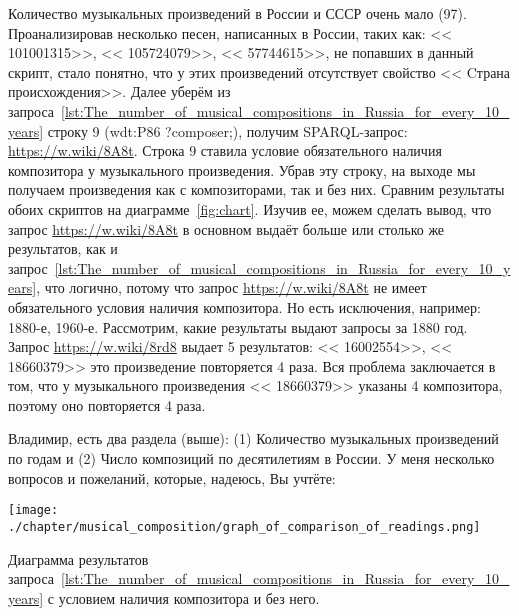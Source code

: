 Количество музыкальных произведений в России и СССР очень мало (97). Проанализировав несколько песен, написанных в России, таких как: << {101001315}>>, << {105724079}>>, << {57744615}>>, не попавших в данный скрипт, стало понятно, что у этих произведений отсутствует свойство << {Cтрана происхождения}>>.
Далее уберём из запроса~\ref{lst:The_number_of_musical_compositions_in_Russia_for_every_10_years} строку 9 (wdt:P86 ?composer;), получим SPARQL-запрос: \href{https://w.wiki/8A8t}{https://w.wiki/8A8t}. Строка 9 ставила условие обязательного наличия композитора у музыкального произведения. Убрав эту строку, на выходе мы получаем произведения как с композиторами, так и без них. Сравним результаты обоих скриптов на диаграмме~\ref{fig:chart}. Изучив ее, можем сделать вывод, что запрос \href{https://w.wiki/8A8t}{https://w.wiki/8A8t} в основном выдаёт больше или столько же результатов, как и запрос~\ref{lst:The_number_of_musical_compositions_in_Russia_for_every_10_years}, что логично, потому что запрос \href{https://w.wiki/8A8t}{https://w.wiki/8A8t} не имеет обязательного условия наличия композитора. Но есть исключения, например: 1880-е, 1960-е. Рассмотрим, какие результаты выдают запросы за 1880 год. Запрос \href{https://w.wiki/8rd8}{https://w.wiki/8rd8} выдает 5 результатов: << {16002554}>>, << {18660379}>> это произведение повторяется 4 раза. Вся проблема заключается в том, что у музыкального произведения  << {18660379}>> указаны 4 композитора, поэтому оно повторяется 4 раза.


\TODO Владимир, есть два раздела (выше): (1) Количество музыкальных произведений по годам 
и (2) Число композиций по десятилетиям в России. 
У меня несколько вопросов и пожеланий, которые, надеюсь, Вы учтёте: 


\begin{marginfigure}[0\baselineskip]
	\texttt{[image: ./chapter/musical\_composition/graph\_of\_comparison\_of\_readings.png]}
	\caption[Диаграмма результатов запроса~\ref{lst:The_number_of_musical_compositions_in_Russia_for_every_10_years} с условием наличия композитора и без него.]{Диаграмма результатов запроса~\ref{lst:The_number_of_musical_compositions_in_Russia_for_every_10_years} с условием наличия композитора и без него.}%
	\label{fig:chart}%
\end{marginfigure}

